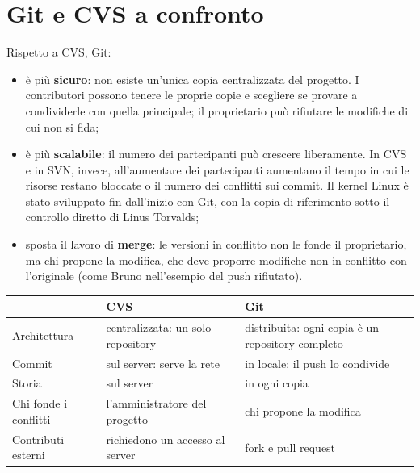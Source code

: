 \section{Git e CVS a confronto}

Rispetto a CVS, Git:

\begin{itemize}
  \item è più \textbf{sicuro}: non esiste un'unica copia centralizzata del progetto. I contributori possono tenere le
        proprie copie e scegliere se provare a condividerle con quella principale; il proprietario può rifiutare le
        modifiche di cui non si fida;
  \item è più \textbf{scalabile}: il numero dei partecipanti può crescere liberamente. In CVS e in SVN, invece,
        all'aumentare dei partecipanti aumentano il tempo in cui le risorse restano bloccate o il numero dei conflitti sui
        commit. Il kernel Linux è stato sviluppato fin dall'inizio con Git, con la copia di riferimento sotto il
        controllo diretto di Linus Torvalds;
  \item sposta il lavoro di \textbf{merge}: le versioni in conflitto non le fonde il proprietario, ma chi propone la
        modifica, che deve proporre modifiche non in conflitto con l'originale (come Bruno nell'esempio del push
        rifiutato).
\end{itemize}

\begin{center}
\renewcommand{\arraystretch}{1.3}
\begin{tabular}{@{}P{4cm}P{5cm}P{5cm}@{}}
  \toprule
  & \textbf{CVS} & \textbf{Git} \\ \midrule
  Architettura & centralizzata: un solo repository & distribuita: ogni copia è un repository completo \\
  Commit & sul server: serve la rete & in locale; il push lo condivide \\
  Storia & sul server & in ogni copia \\
  Chi fonde i conflitti & l'amministratore del progetto & chi propone la modifica \\
  Contributi esterni & richiedono un accesso al server & fork e pull request \\
  \bottomrule
\end{tabular}
\end{center}


